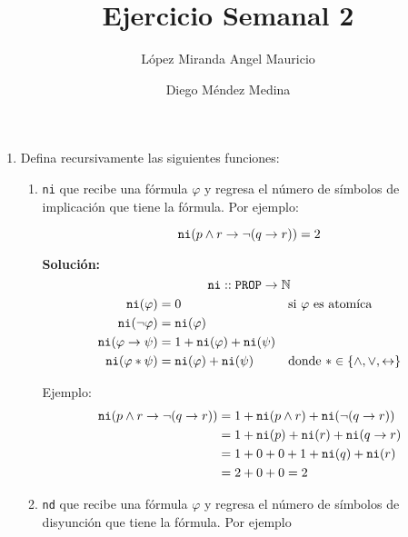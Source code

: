 \documentclass[8pt, letterpaper]{article}
\title{%
  Ejercicio Semanal 2\\
  {\large{}}}
\author{López Miranda Angel Mauricio\and Diego Méndez Medina}
\date{}
\begin{document}
\ttfamily
\maketitle
\rmfamily
\begin{enumerate}
\item Defina recursivamente las siguientes funciones:

  \begin{enumerate}
    
  \item {\tt ni} que recibe una fórmula $\varphi$ y regresa el número
    de símbolos de implicación que tiene la fórmula. Por ejemplo:

    $${\tt ni} (p \land r \to \lnot (q \to r)) = 2$$
    
    \ttfamily
    {\bf Solución:}
    \hfill\break
    $${\tt ni} :: {\tt PROP} \rightarrow \mathbb{N}$$
    \begin{align*} 
      {\tt ni}(\varphi) &= 0 & &\text{si $\varphi$ es atomíca}\\
      {\tt ni}(\neg\varphi) &= {\tt ni}(\varphi) \\
      {\tt ni}(\varphi \rightarrow \psi) &= 1 + {\tt ni}(\varphi) +
      {\tt ni}(\psi) \\
      {\tt ni}(\varphi * \psi) &= {\tt ni}(\varphi) + {\tt ni}(\psi) &
      &\text{donde $*$} \in\{\land, \lor, \leftrightarrow\}\\
    \end{align*}

    Ejemplo:
    \begin{align*}
      {\tt ni} (p \land r \to \lnot (q \to r)) &= 1 +
      {\tt ni} (p \land r) +  {\tt ni}(\lnot (q \to r)) \\
      &= 1 + {\tt ni}(p) +  {\tt ni}(r) +  {\tt ni}(q \to r) \\
      &= 1 + 0 +  0 +  1+ {\tt ni}(q) + {\tt ni}(r) \\
      &= 2 + 0 + 0 = 2
    \end{align*}
    \rmfamily
    
  \item {\tt nd} que recibe una fórmula $\varphi$ y regresa el número de
    símbolos de disyunción que tiene la fórmula. Por ejemplo
    

\end{enumerate}
\end{enumerate}
\end{document}
